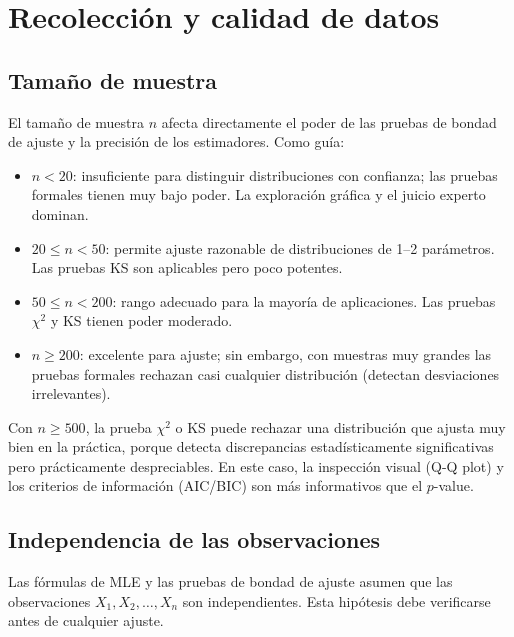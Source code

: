 \documentclass[11pt, letterpaper]{article}
\begin{document}
\section{Recolección y calidad de datos}

\subsection{Tamaño de muestra}

El tamaño de muestra $n$ afecta directamente el poder de las pruebas de bondad de ajuste y la precisión de los estimadores. Como guía:

\begin{itemize}
    \item $n < 20$: insuficiente para distinguir distribuciones con confianza; las pruebas formales tienen muy bajo poder. La exploración gráfica y el juicio experto dominan.
    \item $20 \le n < 50$: permite ajuste razonable de distribuciones de 1--2 parámetros. Las pruebas KS son aplicables pero poco potentes.
    \item $50 \le n < 200$: rango adecuado para la mayoría de aplicaciones. Las pruebas $\chi^2$ y KS tienen poder moderado.
    \item $n \ge 200$: excelente para ajuste; sin embargo, con muestras muy grandes las pruebas formales rechazan casi cualquier distribución (detectan desviaciones irrelevantes).
\end{itemize}

\begin{notabox}
Con $n \ge 500$, la prueba $\chi^2$ o KS puede rechazar una distribución que ajusta muy bien en la práctica, porque detecta discrepancias estadísticamente significativas pero prácticamente despreciables. En este caso, la inspección visual (Q-Q plot) y los criterios de información (AIC/BIC) son más informativos que el $p$-value.
\end{notabox}

\subsection{Independencia de las observaciones}

Las fórmulas de MLE y las pruebas de bondad de ajuste asumen que las observaciones $X_1, X_2, \ldots, X_n$ son independientes. Esta hipótesis debe verificarse antes de cualquier ajuste.
\end{document}
